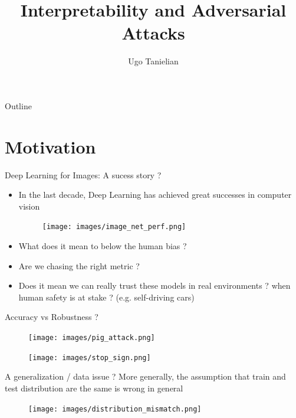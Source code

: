 \documentclass{beamer}
\title{Interpretability and Adversarial Attacks}
\author{Ugo Tanielian}
\begin{document}
\begin{frame} 	 
\titlepage
\end{frame}

\begin{frame}[fragile]{Outline}
  \tableofcontents
\end{frame}

\section{Motivation}

\begin{frame}{Deep Learning for Images: A sucess story ?}

\begin{itemize}
    \item In the last decade, Deep Learning has achieved great successes in computer vision
    
    \begin{figure}[H]
        \centering
        \texttt{[image: images/image\_net\_perf.png]}
    \end{figure}
    
    \item What does it mean to below the human bias ?
    \item Are we chasing the right metric ?
    \item Does it mean we can really trust these models in real environments ? when human safety is at stake ? (e.g. self-driving cars)
\end{itemize}
\end{frame}

\begin{frame}{Accuracy vs Robustness ?}
    \begin{figure}[H]
    \centering
    \texttt{[image: images/pig\_attack.png]}
    \end{figure}
    
    \begin{figure}[H]
    \centering
    \texttt{[image: images/stop\_sign.png]}
    \end{figure}
\end{frame}

\begin{frame}{A generalization / data issue ?}
    More generally, the assumption that train and test distribution are the same is wrong in general
    \begin{figure}
    \centering
    \texttt{[image: images/distribution\_mismatch.png]}
    \end{figure}
\end{frame}
\end{document}
